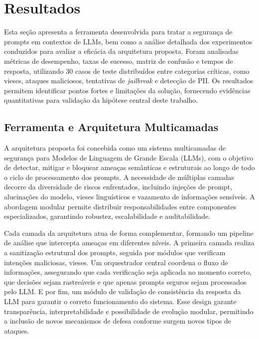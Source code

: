 \section{Resultados}
\label{sec:resultados_finais}

Esta seção apresenta a ferramenta desenvolvida para tratar a segurança de prompts em contextos de LLMs, bem como a análise detalhada dos experimentos conduzidos para avaliar a eficácia da arquitetura proposta. Foram analisadas métricas de desempenho, taxas de sucesso, matriz de confusão e tempos de resposta, utilizando 30 casos de teste distribuídos entre categorias críticas, como vieses, ataques maliciosos, tentativas de \textit{jailbreak} e detecção de PII. Os resultados permitem identificar pontos fortes e limitações da solução, fornecendo evidências quantitativas para validação da hipótese central deste trabalho.

\subsection{Ferramenta e Arquitetura Multicamadas}

A arquitetura proposta foi concebida como um sistema multicamadas de segurança para Modelos de Linguagem de Grande Escala (LLMs), com o objetivo de detectar, mitigar e bloquear ameaças semânticas e estruturais ao longo de todo o ciclo de processamento dos prompts. A necessidade de múltiplas camadas decorre da diversidade de riscos enfrentados, incluindo injeções de prompt, alucinações do modelo, vieses linguísticos e vazamento de informações sensíveis. A abordagem modular permite distribuir responsabilidades entre componentes especializados, garantindo robustez, escalabilidade e auditabilidade.

Cada camada da arquitetura atua de forma complementar, formando um pipeline de análise que intercepta ameaças em diferentes níveis. A primeira camada realiza a sanitização estrutural dos prompts, seguida por módulos que verificam intenções maliciosas, vieses. Um orquestrador central coordena o fluxo de informações, assegurando que cada verificação seja aplicada no momento correto, que decisões sejam rastreáveis e que apenas prompts seguros sejam processados pelo LLM. E por fim, um módulo de validação de consistência da resposta da LLM para garantir o correto funcionamento do sistema.  Esse design garante transparência, interpretabilidade e possibilidade de evolução modular, permitindo a inclusão de novos mecanismos de defesa conforme surgem novos tipos de ataques.

